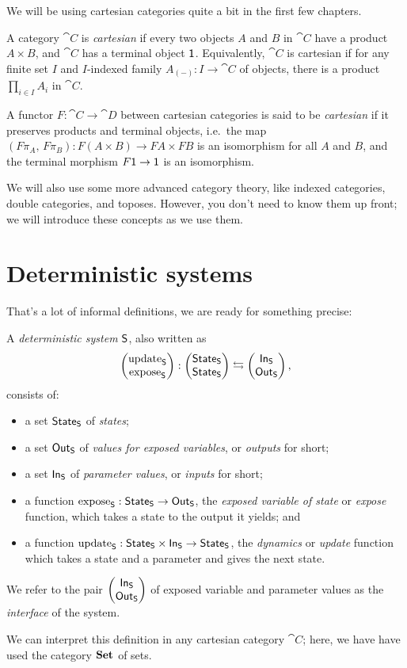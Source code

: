 \documentclass[DynamicalBook]{subfiles}
\begin{document}
We will be using cartesian categories quite a bit in the first few chapters.
\begin{definition}\label{def.cartesian_category}
  A category $\cat{C}$ is \emph{cartesian} if every two objects $A$ and $B$ in
  $\cat{C}$ have a product $A \times B$, and $\cat{C}$ has a terminal object
  $\mathsf{1}$. Equivalently, $\cat{C}$ is cartesian if for any finite set $I$ and
  $I$-indexed family $A_{(-)} : I \to \cat{C}$ of objects, there is a product
  $\prod_{i \in I} A_i$ in $\cat{C}$.

  A functor $F : \cat{C} \to \cat{D}$ between cartesian categories is said to be
  \emph{cartesian} if it preserves products and terminal objects, i.e.\ the
  map $(F\pi_A,\, F\pi_B) : F(A \times B) \to FA \times FB$ is an isomorphism
  for all $A$ and $B$, and the terminal morphism $F\mathsf{1} \to \mathsf{1}$ is an
  isomorphism. 
\end{definition}

We will also use some more advanced category theory, like indexed
categories, double categories, and toposes. However, you don't need to know them up front; we will introduce these concepts
as we use them.

\section{Deterministic systems}

That's a lot of informal definitions, we are ready for something precise:
\begin{definition}\label{def.deterministic_system}
  A \emph{deterministic system} $\mathsf{S}$, also written as 
  $$\begin{pmatrix}{\mathrm{update}_{\mathsf{S}}} \\ {\mathrm{expose}_{\mathsf{S}}} \end{pmatrix} : \begin{pmatrix}{\mathsf{State}_{\mathsf{S}}} \\ {\mathsf{State}_{\mathsf{S}}} \end{pmatrix} \leftrightarrows \begin{pmatrix}{\mathsf{In}_{\mathsf{S}}} \\ {\mathsf{Out}_{\mathsf{S}}} \end{pmatrix},$$ 
  consists of:
  \begin{itemize}
    \item a set $\mathsf{State}_{\mathsf{S}}$ of \emph{states};
    \item a set $\mathsf{Out}_{\mathsf{S}}$ of \emph{values for exposed variables}, or \emph{outputs}
      for short;
    \item a set $\mathsf{In}_{\mathsf{S}}$ of \emph{parameter values}, or \emph{inputs} for short;
    \item a function $\mathrm{expose}_{\mathsf{S}} : \mathsf{State}_{\mathsf{S}} \to \mathsf{Out}_{\mathsf{S}}$, the \emph{exposed variable of state} or
      \emph{expose} function, which takes a state to the output it yields; and
    \item a function $\mathrm{update}_{\mathsf{S}} : \mathsf{State}_{\mathsf{S}} \times \mathsf{In}_{\mathsf{S}} \to \mathsf{State}_{\mathsf{S}}$, the \emph{dynamics} or
      \emph{update} function which takes a state and a parameter and gives the
      next state.
  \end{itemize}
  We refer to the pair $\begin{pmatrix}{\mathsf{In}_{\mathsf{S}}} \\ {\mathsf{Out}_{\mathsf{S}}} \end{pmatrix}$ of exposed variable and parameter values as
  the \emph{interface} of the system.

We can interpret this definition in any cartesian category $\cat{C}$; here, we
have have used the category $\textbf{Set}$ of sets.
\end{definition}
\end{document}
